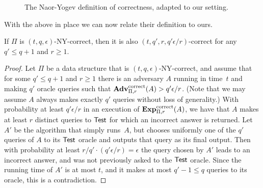 \begin{figure}[htp]
\centering
{}
\caption{The Naor-Yogev definition of correctness, adapted to our setting.}
\label{fig:NYcorrectness}
\end{figure}

With the above in place we can now relate their definition to ours.
\begin{theorem}
If $\Pi$ is $(t,q,\epsilon)$-NY-correct, then it is also
$(t, q', r, q'\epsilon/r)$-correct for any $q' \leq q+1$ and $r\geq
1$.
\end{theorem}
\begin{proof}
Let $\Pi$ be a data structure that is $(t,q,\epsilon)$-NY-correct,
and assume that for some $q' \leq q+1$ and
$r \geq 1$
there is an adversary $A$ running in time~$t$
and making $q'$ oracle queries such that
$\mathrm{\mathbf{Adv}}^{\mathrm{correct}}_{\Pi,r}(A) > q'\epsilon/r$.
(Note that
we may assume $A$ always makes exactly $q'$ queries without loss of generality.)
With probability at least
$q'\epsilon/r$ in an execution of $\mathrm{\mathbf{Exp}}^{\mathrm{correct}}_{\Pi,r}(A)$, we have that
$A$ makes at least $r$ distinct queries to $\mathsf{Test}$ for which
an incorrect answer is returned. Let $A'$ be the algorithm that simply
runs~$A$, but chooses
uniformly one of the $q'$ queries of $A$ to its $\mathsf{Test}$ oracle and outputs that query
as its final output. Then with probability at least $r/q' \cdot (q'\epsilon/r)=\epsilon$
the query chosen by $A'$
leads to an incorrect answer, and was not previously asked to the $\mathsf{Test}$ oracle.
Since the running time of $A'$ is at most $t$, and it makes at most $q'-1 \leq q$ queries
to its oracle, this is a contradiction.
\end{proof}

